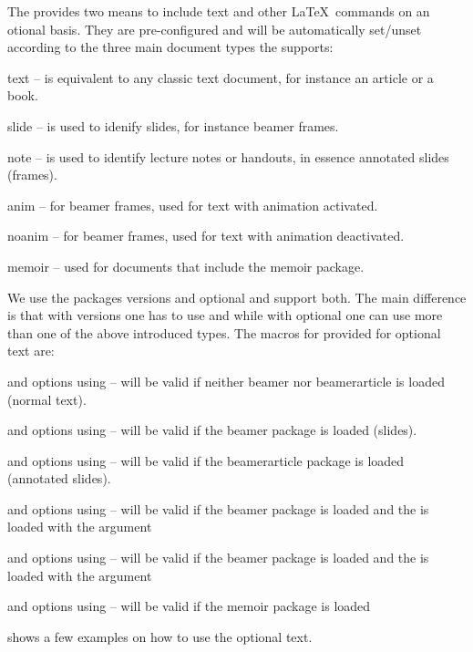
The  provides two means to include text and other \LaTeX~commands on an otional
basis. They are pre-configured and will be automatically set/unset according to the 
three main document types the  supports:
\begin{skbnotelist}
  \item text   -- is equivalent to any classic text document, for instance an article or a book.
  \item slide  -- is used to idenify slides, for instance beamer frames.
  \item note   -- is used to identify lecture notes or handouts, in essence annotated slides (frames).
  \item anim   -- for beamer frames, used for text with animation activated.
  \item noanim -- for beamer frames, used for text with animation deactivated.
  \item memoir -- used for documents that include the memoir package.
\end{skbnotelist}

We use the packages versions and optional and support both. The main difference is that with versions
one has to use \cmd{\beging} and \cmd{\end} while with optional one can use more than one of the above
introduced types. The macros for provided for optional text are:
\begin{skbnotelist}
  \item \cmd{\skbmodetext} and options using      -- will be valid if neither beamer nor beamerarticle is loaded (normal text).
  \item \cmd{\skbmodeslide} and options using    -- will be valid if the beamer package is loaded (slides).
  \item \cmd{\skbmodenote} and options using      -- will be valid if the beamerarticle package is loaded (annotated slides).
  \item \cmd{\skbmodeanim} and options using      -- will be valid if the beamer package is loaded and the  is loaded with the argument 
  \item \cmd{\skbmodenoanim} and options using  -- will be valid if the beamer package is loaded and the  is loaded with the argument 
  \item \cmd{\skbmodememoir} and options using  -- will be valid if the memoir package is loaded
\end{skbnotelist}

 shows a few examples on how to use the optional text.